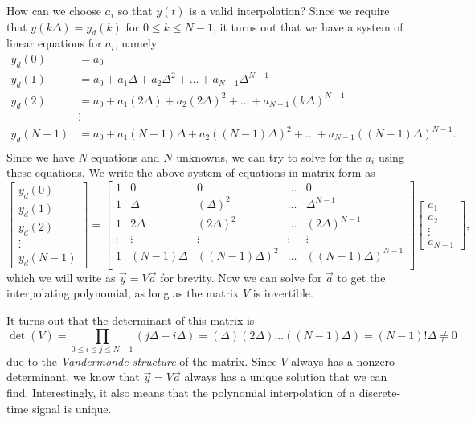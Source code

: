 How can we choose $a_i$ so that $y(t)$ is a valid interpolation? Since we require that $y(k\Delta)=y_d(k)$ for $0\le k \le N-1$, it turns out that we have a system of linear equations for $a_i$, namely
\begin{align*}
y_d(0) &= a_0\\
y_d(1) &= a_0 + a_1 \Delta + a_2 \Delta^2 + \dotso + a_{N-1} \Delta^{N-1}\\
y_d(2) &= a_0 + a_1 (2\Delta) + a_2 (2\Delta)^2 + \dotso + a_{N-1} (k\Delta)^{N-1}\\
&\vdots\\
y_d(N-1) &= a_0 + a_1 (N-1)\Delta + a_2 ((N-1)\Delta)^2 + \dotso + a_{N-1} ((N-1)\Delta)^{N-1}.\\
\end{align*}
Since we have $N$ equations and $N$ unknowns, we can try to solve for the $a_i$ using these equations. We write the above system of equations in matrix form as
\begin{equation*}
\begin{bmatrix}
y_d(0) \\ y_d(1) \\ y_d(2) \\ \vdots \\ y_d(N-1)
\end{bmatrix}=
\begin{bmatrix}
1 & 0 & 0 & \hdots & 0\\
1 & \Delta & (\Delta)^2 & \hdots & \Delta^{N-1}\\
1 & 2\Delta & (2\Delta)^2 & \hdots & (2\Delta)^{N-1}\\
\vdots & \vdots & \vdots & \vdots & \vdots\\
1 & (N-1)\Delta & ((N-1)\Delta)^2 & \hdots & ((N-1)\Delta)^{N-1}\\
\end{bmatrix}
\begin{bmatrix}
a_1 \\ a_2 \\ \vdots \\ a_{N-1}
\end{bmatrix},
\end{equation*}
which we will write as $\vec{y} = V \vec{a}$ for brevity. Now we can solve for $\vec a$ to get the interpolating polynomial, as long as the matrix $V$ is invertible. 

It turns out that the determinant of this matrix is
\begin{equation*}
 \det(V) = \prod_{0\le i \le j \le N-1} (j\Delta-i\Delta) = (\Delta)(2\Delta)\dotso((N-1)\Delta)
 =(N-1)!\Delta \ne 0
\end{equation*}
due to the \emph{Vandermonde structure} of the matrix.
Since $V$ always has a nonzero determinant, we know that $\vec{y}=V\vec{a}$ always has a unique solution that we can find. Interestingly, it also means that the polynomial interpolation of a discrete-time signal is unique.
